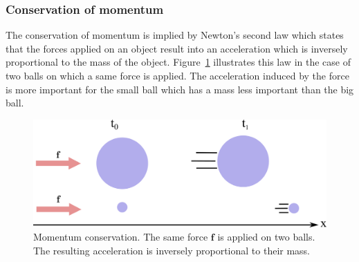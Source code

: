 \subsubsection{Conservation of momentum}
\label{subsubsec:starMechanics_momentumConservation}
The conservation of momentum is implied by Newton's second law which states that the forces applied on an object result into an acceleration which is inversely proportional to the mass of the object.
Figure~\ref{fig:momentumConservation} illustrates this law in the case of two balls on which a same force is applied.
The acceleration induced by the force is more important for the small ball which has a mass less important than the big ball.
\begin{figure}[!h]
\centering
\includegraphics[width=\linewidth]{images/continuum_mechanics/momentumConservation.png}
\caption[STAR mechanics: Momentum conservation]{\label{fig:momentumConservation} Momentum conservation. The same force $\mathbf{f}$ is applied on two balls. The resulting acceleration is inversely proportional to their mass.}
\end{figure}

